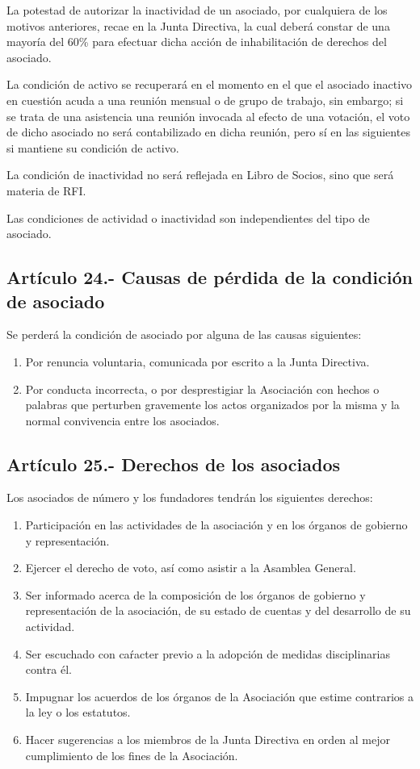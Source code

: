 \documentclass[10pt, spanish, pdftex]{gulplantilla}
\begin{document}
La potestad de autorizar la inactividad de un asociado, por cualquiera de los motivos anteriores, recae en la Junta Directiva, la cual deberá constar de una mayoría del 60\% para efectuar dicha acción de inhabilitación de derechos del asociado.

La condición de activo se recuperará en el momento en el que el asociado inactivo en cuestión acuda a una reunión mensual o de grupo de trabajo, sin embargo; si se trata de una asistencia una reunión invocada al efecto de una votación, el voto de dicho asociado no será contabilizado en dicha reunión, pero sí en las siguientes si mantiene su condición de activo.

La condición de inactividad no será reflejada en Libro de Socios, sino que será materia de RFI.

Las condiciones de actividad o inactividad son independientes del tipo de asociado.

\subsection{Artículo 24.- Causas de pérdida de la condición de asociado}
Se perderá la condición de asociado por alguna de las causas siguientes:
\begin{enumerate}[label=\alph*)]
    \item Por renuncia voluntaria, comunicada por escrito a la Junta Directiva.
    \item Por conducta incorrecta, o por desprestigiar la Asociación con hechos o palabras que perturben gravemente los actos organizados por la misma y la normal convivencia entre los asociados.
\end{enumerate}

\subsection{Artículo 25.- Derechos de los asociados}
Los asociados de número y los fundadores tendrán los siguientes derechos:
\begin{enumerate}[label=\alph*)]
    \item Participación en las actividades de la asociación y en los órganos de gobierno y representación.
    \item Ejercer el derecho de voto, así como asistir a la Asamblea General.
    \item Ser informado acerca de la composición de los órganos de gobierno y representación de la asociación, de su estado de cuentas y del desarrollo de su actividad.
    \item Ser escuchado con caŕacter previo a la adopción de medidas disciplinarias contra él.
    \item Impugnar los acuerdos de los órganos de la Asociación que estime contrarios a la ley o los estatutos.
    \item Hacer sugerencias a los miembros de la Junta Directiva en orden al mejor cumplimiento de los fines de la Asociación.
\end{enumerate}
\end{document}
